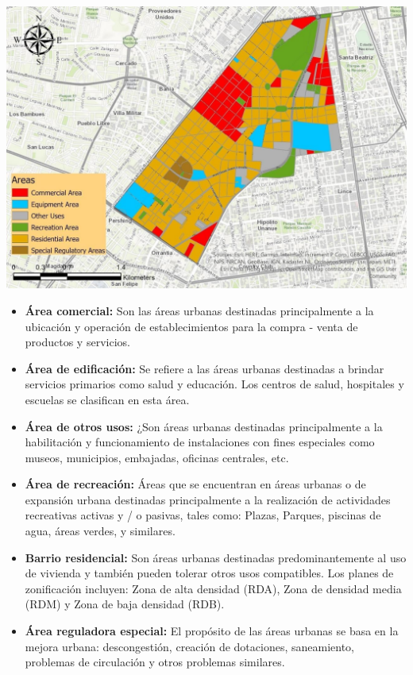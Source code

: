 \documentclass[
]{article}
\providecommand{\tightlist}{%
  \setlength{\itemsep}{0pt}\setlength{\parskip}{0pt}}
\begin{document}
\begin{center}\includegraphics{Img/distrito_clasificado} \end{center}

\begin{itemize}
\tightlist
\item
  \textbf{Área comercial:} Son las áreas urbanas destinadas
  principalmente a la ubicación y operación de establecimientos para la
  compra - venta de productos y servicios.
\item
  \textbf{Área de edificación:} Se refiere a las áreas urbanas
  destinadas a brindar servicios primarios como salud y educación. Los
  centros de salud, hospitales y escuelas se clasifican en esta área.
\item
  \textbf{Área de otros usos:} ¿Son áreas urbanas destinadas
  principalmente a la habilitación y funcionamiento de instalaciones con
  fines especiales como museos, municipios, embajadas, oficinas
  centrales, etc.
\item
  \textbf{Área de recreación:} Áreas que se encuentran en áreas urbanas
  o de expansión urbana destinadas principalmente a la realización de
  actividades recreativas activas y / o pasivas, tales como: Plazas,
  Parques, piscinas de agua, áreas verdes, y similares.
\item
  \textbf{Barrio residencial:} Son áreas urbanas destinadas
  predominantemente al uso de vivienda y también pueden tolerar otros
  usos compatibles. Los planes de zonificación incluyen: Zona de alta
  densidad (RDA), Zona de densidad media (RDM) y Zona de baja densidad
  (RDB).
\item
  \textbf{Área reguladora especial:} El propósito de las áreas urbanas
  se basa en la mejora urbana: descongestión, creación de dotaciones,
  saneamiento, problemas de circulación y otros problemas similares.
\end{itemize}
\end{document}
